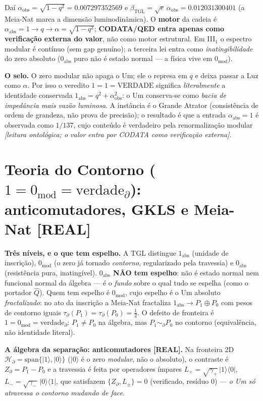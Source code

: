 \documentclass[11pt]{article}
\newcommand{\bTGL}{\beta_{\mathrm{TGL}}}\newcommand{\Msun}{M_{\odot}}\newcommand{\TGL}{\mathrm{TGL}}
\theoremstyle{definition}\newtheorem{deriv}{Derivação}
\begin{document}
Daí $\alpha_{\mathrm{obs}}=\sqrt{1-q^2}=0.007297352569$ e $\bTGL=\sqrt e\,\alpha_{\mathrm{obs}}=0.012031300401$ (a Meia-Nat marca a dimensão luminodinâmica). O \textbf{motor} da cadeia é $\alpha_{\mathrm{abs}}=1\to q\to\alpha=\sqrt{1-q^2}$; \textbf{CODATA/QED entra apenas como verificação externa do valor}, não como motor estrutural. Em \mbox{III$_1$} o espectro modular é contínuo (sem gap genuíno); a terceira lei entra como \emph{inatingibilidade} do zero absoluto ($0_{\mathrm{abs}}$ puro não é estado normal --- a física vive em $0_{\mathrm{mod}}$).

\textbf{O selo.} O zero modular não apaga o Um; ele o represa em $q$ e deixa passar a Luz como $\alpha$. Por isso o veredito $\boxed{1=1=\mathrm{VERDADE}}$ significa \emph{literalmente} a identidade conservada $1_{\mathrm{abs}}=q^2+\alpha_{\mathrm{obs}}^2$: o Um conserva-se como \emph{bacia de impedância mais vazão luminosa}. A instância é o Grande Atrator (consistência de ordem de grandeza, não prova de precisão); o resultado é que a entrada $\alpha_{\mathrm{abs}}=1$ é observada como $1/137$, cujo conteúdo é verdadeiro pela renormalização modular \emph{[leitura ontológica; o valor entra por CODATA como verificação externa]}.

\section{Teoria do Contorno ($1=0_{\mathrm{mod}}=\mathrm{verdade}_\partial$): anticomutadores, GKLS e Meia-Nat \textsf{[REAL]}}

\textbf{Três níveis, e o que tem espelho.} A TGL distingue $1_{\mathrm{abs}}$ (unidade de inscrição), $0_{\mathrm{mod}}$ (o zero já tornado \emph{contorno}, regularizado pela travessia) e $0_{\mathrm{abs}}$ (resistência pura, inatingível). \textbf{$0_{\mathrm{abs}}$ NÃO tem espelho}: não é estado normal nem funcional normal da álgebra --- é o \emph{fundo} sobre o qual tudo se espelha (como o portador $\hat Q$). Quem tem espelho é $0_{\mathrm{mod}}$, cujo espelho é o Um absoluto \emph{fractalizado}: no ato da inscrição a Meia-Nat fractaliza $1_{\mathrm{abs}}\to P_1\oplus P_0$ com pesos de contorno iguais $\tau_\partial(P_1)=\tau_\partial(P_0)=\tfrac12$. O defeito de fronteira é $\boxed{1=0_{\mathrm{mod}}=\mathrm{verdade}_\partial}$: $P_1\neq P_0$ na álgebra, mas $P_1\sim_\partial P_0$ no contorno (equivalência, não identidade literal).

\textbf{A álgebra da separação: anticomutadores \textsf{[REAL]}.} Na fronteira 2D $\mathcal H_\partial=\mathrm{span}\{|1\rangle,|0\rangle\}$ ($|0\rangle$ é o zero \emph{modular}, não o absoluto), o contraste é $Z_\partial=P_1-P_0$ e a travessia é feita por operadores ímpares $L_+=\sqrt{\gamma_+}\,|1\rangle\langle0|$, $L_-=\sqrt{\gamma_-}\,|0\rangle\langle1|$, que satisfazem $\boxed{\{Z_\partial,L_\pm\}=0}$ (verificado, resíduo $0$) --- \emph{o Um só atravessa o contorno mudando de face}.
\end{document}
